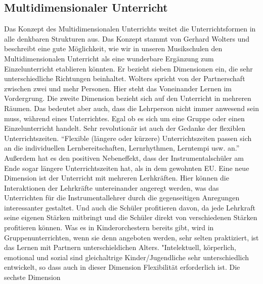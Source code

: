 





\subsection{Multidimensionaler Unterricht} 
Das Konzept des Multidimensionalen Unterrichts weitet die Unterrichtsformen in
alle denkbaren Strukturen aus. Das Konzept stammt von Gerhard Wolters und
beschreibt eine gute Möglichkeit, wie wir in unseren Musikschulen den
Multidimensionalen Unterricht als eine wunderbare Ergänzung zum Einzelunterricht
etablieren könnten. Er bezieht sieben Dimensionen ein, die sehr unterschiedliche
Richtungen beinhaltet. \autocite[86ff]{ernst:die_zukunftsfaehige_musikschule}
Wolters spricht von der Partnerschaft zwischen zwei und mehr Personen. Hier
steht das Voneinander Lernen im Vordergrung. Die zweite Dimension bezieht sich
auf den Unterricht in mehreren Räumen. Das bedeutet aber auch, dass die
Lehrperson nicht immer anwesend sein muss, während eines Unterrichtes. Egal ob
es sich um eine Gruppe oder einen Einzelunterricht handelt. Sehr revolutionär
ist auch der Gedanke der flexiblen Unterrichtszeiten. \enquote{Flexible (längere
oder kürzere) Unterrichtszeiten passen sich an die individuellen
Lernbereitschaften, Lernrhythmen, Lerntempi usw. an.}
\autocite[87]{ernst:die_zukunftsfaehige_musikschule} Außerdem hat es den
positiven Nebeneffekt, dass der Instrumentalschüler am Ende sogar längere
Unterrichtszeiten hat, als in dem gewohnten EU. Eine neue Dimension ist der
Unterricht mit mehreren Lerhkräften. Hier können die Interaktionen der
Lehrkräfte untereinander angeregt werden, was das Unterrichten für die
Instrumentallehrer durch die gegenseitigen Anregungen interessanter gestaltet.
Und auch die Schüler profitieren davon, da jede Lehrkraft seine eigenen Stärken
mitbringt und die Schüler direkt von verschiedenen Stärken profitieren können.
Was es in Kinderorchestern bereits gibt, wird in Gruppenunterrichten, wenn sie
denn angeboten werden, sehr selten praktiziert, ist das Lernen mit Partnern
unterschieldichen Alters. "Intelektuell, körperlich, emotional und sozial sind
gleichaltrige Kinder/Jugendliche sehr unterschiedlich entwickelt, so dass auch
in dieser Dimension Flexibilität erforderlich ist.
\autocite[87]{ernst:die_zukunftsfaehige_musikschule} Die sechste Dimension
